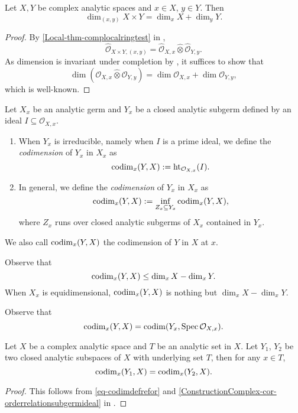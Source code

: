 \begin{proposition}
    Let $X,Y$ be complex analytic spaces and $x\in X$, $y\in Y$. Then
    \[
        \dim_{(x,y)}X\times Y=\dim_x X+\dim_y Y.  
    \]
\end{proposition}
\begin{proof}
    By \cref{Local-thm-complocalringtest} in ,
    \[
        \hat{\mathcal{O}}_{X\times Y,(x,y)}=\hat{\mathcal{O}}_{X,x}\hat{\otimes}\hat{\mathcal{O}}_{Y,y}.  
    \]
    As dimension is invariant under completion by \cite[\href{https://stacks.math.columbia.edu/tag/07NV}{Tag 07NV}]{stacks-project}, it suffices to show that
    \[
        \dim (\mathcal{O}_{X,x}\hat{\otimes} \mathcal{O}_{Y,y}) =\dim \mathcal{O}_{X,x}+\dim \mathcal{O}_{Y,y}, 
    \]
    which is well-known.
\end{proof}



\begin{definition}
    Let $X_x$ be an analytic germ and $Y_x$ be a closed analytic subgerm defined by an ideal $I\subseteq \mathcal{O}_{X,x}$.
    \begin{enumerate}
        \item When $Y_x$ is irreducible, namely when $I$ is a prime ideal, we define the \emph{codimension} of $Y_x$ in $X_x$ as 
            \[
                \operatorname{codim}_x(Y,X):=\operatorname{ht}_{\mathcal{O}_{X,x}}(I).    
            \]
        \item In general, we define the \emph{codimension} of $Y_x$ in $X_x$ as 
        \[
            \operatorname{codim}_x(Y,X):=\inf_{Z_x\subseteq Y_x} \operatorname{codim}_x(Y,X),
        \]
        where $Z_x$ runs over closed analytic subgerms of $X_x$ contained in $Y_x$.
    \end{enumerate}
    We also call $\operatorname{codim}_x(Y,X)$ the codimension of $Y$ in $X$ at $x$.
\end{definition}
Observe that 
\[
    \operatorname{codim}_x(Y,X)\leq \dim_x X-\dim_x Y.
\]
When $X_x$ is equidimensional, $\operatorname{codim}_x(Y,X)$ is nothing but $\dim_x X-\dim_x Y$.

Observe that 
\begin{equation}\label{eq-codimdefrefor}
    \operatorname{codim}_x(Y,X)=\operatorname{codim} (Y_x,\operatorname{Spec} \mathcal{O}_{X,x}).
\end{equation}

\begin{lemma}\label{lma-codimindp}
    Let $X$ be a complex analytic space and $T$ be an analytic set in $X$. Let $Y_1$, $Y_2$ be two closed analytic subspaces of $X$ with underlying set $T$, then for any $x\in T$,
    \[
        \operatorname{codim}_x(Y_1,X)=\operatorname{codim}_x(Y_2,X).
    \]
\end{lemma}
\begin{proof}
    This follows from \eqref{eq-codimdefrefor} and \cref{ConstructionComplex-cor-orderrelationsubgermideal} in .
\end{proof}

